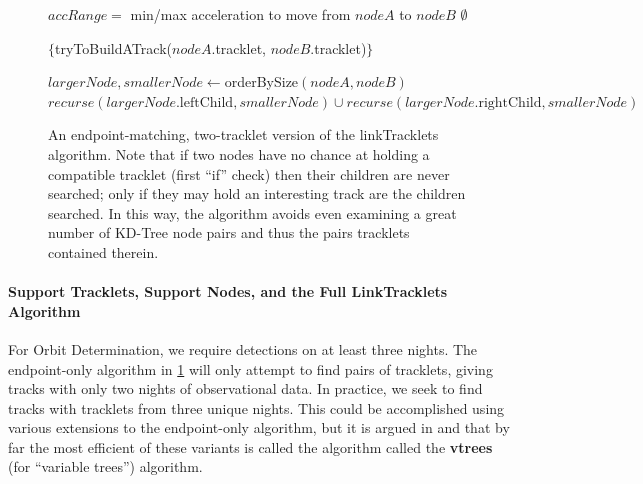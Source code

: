 \begin{figure}[ht!]
\begin{algorithmic}
  
  \STATE $accRange = $ min/max acceleration to move from $nodeA$ to $nodeB$
  \RETURN $\emptyset$
  \ELSE
  
  \STATE {}
    
    \RETURN $\{$tryToBuildATrack($nodeA$.tracklet, $nodeB$.tracklet)$\}$
    \ELSE
    
    \STATE {}
    
    \STATE $largerNode, smallerNode \gets $orderBySize$(nodeA, nodeB)$
    \RETURN $recurse(largerNode.\text{leftChild}, smallerNode) \cup recurse(largerNode.\text{rightChild}, smallerNode)$
    \ENDIF
    \ENDIF
    
  \end{algorithmic}
  \caption{An endpoint-matching, two-tracklet version of the
    linkTracklets algorithm.  Note that if two nodes have no chance at
    holding a compatible tracklet (first ``if'' check) then their
    children are never searched; only if they may hold an interesting
    track are the children searched.  In this way, the algorithm
    avoids even examining a great number of KD-Tree node pairs and
    thus the pairs tracklets contained therein.}
  
  \label{simplifiedLinkTracklets}
\end{figure}

\paragraph{Support Tracklets, Support Nodes, and the Full LinkTracklets Algorithm}

For Orbit Determination, we require detections on at least three
nights.  The endpoint-only algorithm in \ref{simplifiedLinkTracklets}
will only attempt to find pairs of tracklets, giving tracks with only
two nights of observational data.  In practice, we seek to find tracks
with tracklets from three unique nights.  This could be accomplished
using various extensions to the endpoint-only algorithm, but it is
argued in \citet{kubica_thesis} and
\citet{Kubica:2005:MTA:1081870.1081889} that by far the most efficient
of these variants is called the algorithm called the {\bf vtrees} (for
``variable trees'') algorithm.

